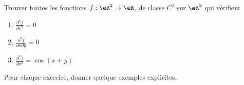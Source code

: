 \begin{exercice}[\minsyndical]\label{exoCalculDifferentiel0012}

Trouver toutes les fonctions $f:\eR^2\to\eR$, de classe $C^2$ sur $\eR^2$ qui vérifient
\begin{enumerate}
	\item
 $\displaystyle\frac{\partial^2 f}{\partial x^2} = 0$
	\item	
  $\displaystyle\frac{\partial^2 f}{\partial x \partial y} = 0 $
  \item\boringexo
  $\displaystyle\frac{\partial^2 f}{\partial x^2} = \cos(x+y)$
\end{enumerate}

Pour chaque exercice, donner quelque exemples explicites.


\end{exercice}
